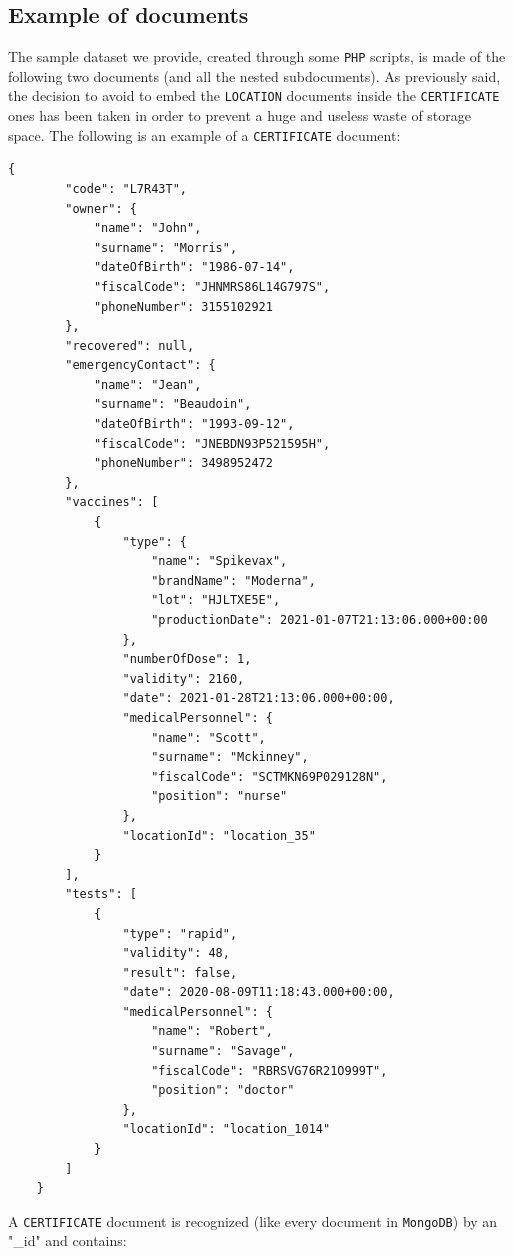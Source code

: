 \documentclass{article}
\begin{document}
\subsection{Example of documents}
The sample dataset we provide, created through some \verb|PHP| scripts, is made of the following two documents (and all the nested subdocuments). As previously said, the decision to avoid to embed the \verb|LOCATION| documents inside the \verb|CERTIFICATE| ones has been taken in order to prevent a huge and useless waste of storage space. The following is an example of a \verb|CERTIFICATE| document:
\begin{verbatim}
{
        "code": "L7R43T",
        "owner": {
            "name": "John",
            "surname": "Morris",
            "dateOfBirth": "1986-07-14",
            "fiscalCode": "JHNMRS86L14G797S",
            "phoneNumber": 3155102921
        },
        "recovered": null,
        "emergencyContact": {
            "name": "Jean",
            "surname": "Beaudoin",
            "dateOfBirth": "1993-09-12",
            "fiscalCode": "JNEBDN93P521595H",
            "phoneNumber": 3498952472
        },
        "vaccines": [
            {
                "type": {
                    "name": "Spikevax",
                    "brandName": "Moderna",
                    "lot": "HJLTXE5E",
                    "productionDate": 2021-01-07T21:13:06.000+00:00
                },
                "numberOfDose": 1,
                "validity": 2160,
                "date": 2021-01-28T21:13:06.000+00:00,
                "medicalPersonnel": {
                    "name": "Scott",
                    "surname": "Mckinney",
                    "fiscalCode": "SCTMKN69P029128N",
                    "position": "nurse"
                },
                "locationId": "location_35"
            }
        ],
        "tests": [
            {
                "type": "rapid",
                "validity": 48,
                "result": false,
                "date": 2020-08-09T11:18:43.000+00:00,
                "medicalPersonnel": {
                    "name": "Robert",
                    "surname": "Savage",
                    "fiscalCode": "RBRSVG76R21O999T",
                    "position": "doctor"
                },
                "locationId": "location_1014"
            }
        ]
    }
\end{verbatim}
A \verb|CERTIFICATE| document is recognized (like every document in \verb|MongoDB|) by an "\_id" and contains:
\end{document}
